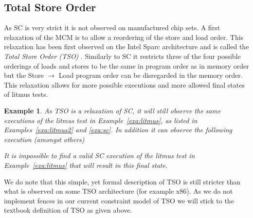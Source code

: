 \documentclass[runningheads]{llncs}
\newtheorem{exa}{Example}
\begin{document}
\subsection{Total Store Order}
\label{sec:tso}
As SC is very strict it is not observed on manufactured chip sets.
A first relaxation of the MCM is to allow a reordering of the store and load order.
This relaxation has been first observed on the Intel Sparc architecture and is called the \emph{Total Store Order (TSO)} \cite{sparc1994}.
Similarly to SC it restricts three of the four possible orderings of loads and stores to be the same in program order as in memory order but the Store $\rightarrow$ Load program order can be disregarded in the memory order.
This relaxation allows for more possible executions and more allowed final states of litmus tests.

\begin{exa}
\label{exa:tso}
As TSO is a relaxation of SC, it will still observe the same executions of the litmus test in Example~\ref{exa:litmus}, as listed in Examples~\ref{exa:litmus2} and \ref{exa:sc}.
In addition it can observe the following execution (amongst others)
\begin{table}[H]
\begin{center}
{}
\end{center}
\end{table}
\vspace{-1cm}

It is impossible to find a valid SC execution of the litmus test in Example~\ref{exa:litmus} that will result in this final state.
\end{exa}


We do note that this simple, yet formal description of TSO is still stricter than what is observed on some TSO architecture (for example x86).
As we do not implement fences in our current constraint model of TSO we will stick to the textbook definition of TSO as given above.
\end{document}
